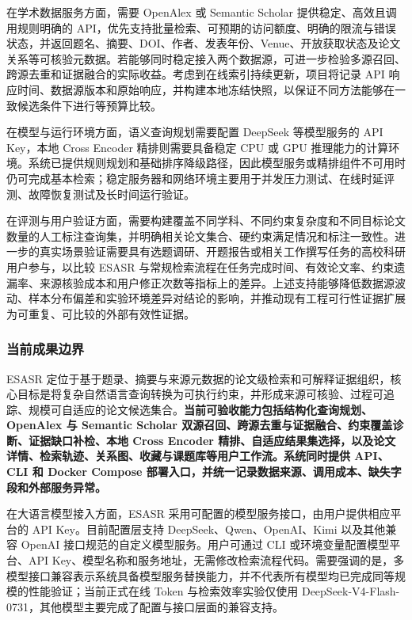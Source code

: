 \documentclass[a4paper,12pt,fontset=none]{ctexart}
\begin{document}
在学术数据服务方面，需要 OpenAlex 或 Semantic Scholar 提供稳定、高效且调用规则明确的 API，优先支持批量检索、可预期的访问额度、明确的限流与错误状态，并返回题名、摘要、DOI、作者、发表年份、Venue、开放获取状态及论文关系等可核验元数据。若能够同时稳定接入两个数据源，可进一步检验多源召回、跨源去重和证据融合的实际收益。考虑到在线索引持续更新，项目将记录 API 响应时间、数据源版本和原始响应，并构建本地冻结快照，以保证不同方法能够在一致候选条件下进行等预算比较。

在模型与运行环境方面，语义查询规划需要配置 DeepSeek 等模型服务的 API Key，本地 Cross Encoder 精排则需要具备稳定 CPU 或 GPU 推理能力的计算环境。系统已提供规则规划和基础排序降级路径，因此模型服务或精排组件不可用时仍可完成基本检索；稳定服务器和网络环境主要用于并发压力测试、在线时延评测、故障恢复测试及长时间运行验证。

在评测与用户验证方面，需要构建覆盖不同学科、不同约束复杂度和不同目标论文数量的人工标注查询集，并明确相关论文集合、硬约束满足情况和标注一致性。进一步的真实场景验证需要具有选题调研、开题报告或相关工作撰写任务的高校科研用户参与，以比较 ESASR 与常规检索流程在任务完成时间、有效论文率、约束遗漏率、来源核验成本和用户修正次数等指标上的差异。上述支持能够降低数据源波动、样本分布偏差和实验环境差异对结论的影响，并推动现有工程可行性证据扩展为可重复、可比较的外部有效性证据。

\subsubsection{当前成果边界}

ESASR 定位于基于题录、摘要与来源元数据的论文级检索和可解释证据组织，核心目标是将复杂自然语言查询转换为可执行约束，并形成来源可核验、过程可追踪、规模可自适应的论文候选集合。\textbf{当前可验收能力包括结构化查询规划、OpenAlex 与 Semantic Scholar 双源召回、跨源去重与证据融合、约束覆盖诊断、证据缺口补检、本地 Cross Encoder 精排、自适应结果集选择，以及论文详情、检索轨迹、关系图、收藏与课题库等用户工作流。系统同时提供 API、CLI 和 Docker Compose 部署入口，并统一记录数据来源、调用成本、缺失字段和外部服务异常。}

在大语言模型接入方面，ESASR 采用可配置的模型服务接口，由用户提供相应平台的 API Key。目前配置层支持 DeepSeek、Qwen、OpenAI、Kimi 以及其他兼容 OpenAI 接口规范的自定义模型服务。用户可通过 CLI 或环境变量配置模型平台、API Key、模型名称和服务地址，无需修改检索流程代码。需要强调的是，多模型接口兼容表示系统具备模型服务替换能力，并不代表所有模型均已完成同等规模的性能验证；当前正式在线 Token 与检索效率实验仅使用 DeepSeek-V4-Flash-0731，其他模型主要完成了配置与接口层面的兼容支持。
\end{document}
